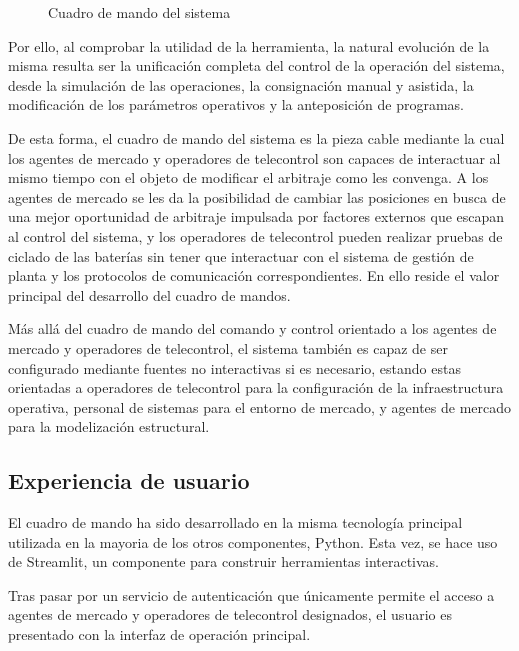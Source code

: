 \begin{figure}
  \centering
  \caption{Cuadro de mando del sistema}
  \label{fig:cuadro-de-mando}
\end{figure}

Por ello, al comprobar la utilidad de la herramienta, la natural evolución de la misma resulta ser la unificación completa del control de la operación del sistema, desde la simulación de las operaciones, la consignación manual y asistida, la modificación de los parámetros operativos y la anteposición de programas.

De esta forma, el cuadro de mando del sistema es la pieza cable mediante la cual los agentes de mercado y operadores de telecontrol son capaces de interactuar al mismo tiempo con el objeto de modificar el arbitraje como les convenga. A los agentes de mercado se les da la posibilidad de cambiar las posiciones en busca de una mejor oportunidad de arbitraje impulsada por factores externos que escapan al control del sistema, y los operadores de telecontrol pueden realizar pruebas de ciclado de las baterías sin tener que interactuar con el sistema de gestión de planta y los protocolos de comunicación correspondientes. En ello reside el valor principal del desarrollo del cuadro de mandos.

Más allá del cuadro de mando del comando y control orientado a los agentes de mercado y operadores de telecontrol, el sistema también es capaz de ser configurado mediante fuentes no interactivas si es necesario, estando estas orientadas a operadores de telecontrol para la configuración de la infraestructura operativa, personal de sistemas para el entorno de mercado, y agentes de mercado para la modelización estructural.

\subsection{Experiencia de usuario}
\label{makereference6.2.1}

El cuadro de mando ha sido desarrollado en la misma tecnología principal utilizada en la mayoria de los otros componentes, Python. Esta vez, se hace uso de Streamlit, un componente para construir herramientas interactivas.

Tras pasar por un servicio de autenticación que únicamente permite el acceso a agentes de mercado y operadores de telecontrol designados, el usuario es presentado con la interfaz de operación principal.

